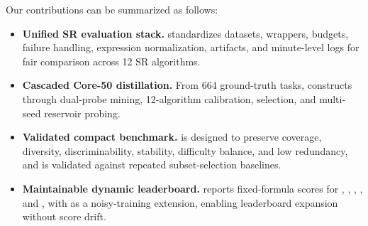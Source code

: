 Our contributions can be summarized as follows:
\begin{itemize}[leftmargin=*, itemsep=2pt, topsep=2pt, parsep=0pt]
    \item \textbf{Unified SR evaluation stack.}
    \arena{} standardizes datasets, wrappers, budgets, failure handling, expression normalization, artifacts, and minute-level logs for fair comparison across 12 SR algorithms.

    \item \textbf{Cascaded Core-50 distillation.}
    From 664 ground-truth tasks, \arena{} constructs \core{} through dual-probe mining, 12-algorithm calibration, \probe{} selection, and multi-seed reservoir probing.

    \item \textbf{Validated compact benchmark.}
    \core{} is designed to preserve coverage, diversity, discriminability, stability, difficulty balance, and low redundancy, and is validated against repeated subset-selection baselines.

    \item \textbf{Maintainable dynamic leaderboard.}
    \arena{} reports fixed-formula scores for \idq{}, \oodg{}, \symf{}, \eff{}, and \stab{}, with \rob{} as a noisy-training extension, enabling leaderboard expansion without score drift.
\end{itemize}

